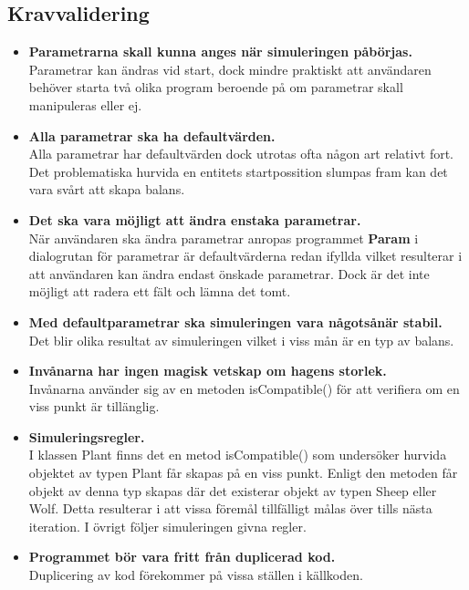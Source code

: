 \documentclass[hidelinks]{article}
\begin{document}
\subsection*{Kravvalidering}
\begin{itemize}
\item \textbf{Parametrarna skall kunna anges när simuleringen påbörjas.}
\\ Parametrar kan ändras vid start, dock mindre praktiskt att användaren behöver starta två olika program beroende på
    om parametrar skall manipuleras eller ej.
\item \textbf{Alla parametrar ska ha defaultvärden.}
\\ Alla parametrar har defaultvärden dock utrotas ofta någon art relativt fort. Det problematiska hurvida en entitets startpossition slumpas fram
    kan det vara svårt att skapa balans.
\item \textbf{Det ska vara möjligt att ändra enstaka parametrar.}
\\ När användaren ska ändra parametrar anropas programmet \textbf{Param} i dialogrutan för parametrar är defaultvärderna redan ifyllda vilket resulterar
    i att användaren kan ändra endast önskade parametrar. Dock är det inte möjligt att radera ett fält och lämna det tomt.
\item \textbf{Med defaultparametrar ska simuleringen vara någotsånär stabil.}
\\ Det blir olika resultat av simuleringen vilket i viss mån är en typ av balans.
\item \textbf{Invånarna har ingen magisk vetskap om hagens storlek.}
\\ Invånarna använder sig av en metoden isCompatible() för att verifiera om en viss punkt är tillänglig.
\item \textbf{Simuleringsregler.}
\\  I klassen Plant finns det en
    metod isCompatible() som undersöker hurvida objektet av typen Plant får skapas på en viss punkt.
    Enligt den metoden får objekt av denna typ skapas där det existerar objekt av typen Sheep eller Wolf.
    Detta resulterar i att vissa föremål tillfälligt målas över tills nästa iteration. I övrigt följer simuleringen givna regler.
\item \textbf{Programmet bör vara fritt från duplicerad kod.}
\\ Duplicering av kod förekommer på vissa ställen i källkoden.
\end{itemize}
\end{document}
